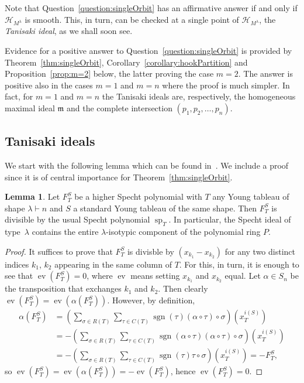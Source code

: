 \documentclass[11pt]{amsart}
\theoremstyle{definition}
\newtheorem{lemma}[theorem]{Lemma}
\newcommand{\mm}{\mathfrak{m}}
\newcommand{\HH}{\mathcal{H}}
\DeclareMathOperator{\spe}{sp}
\DeclareMathOperator{\ev}{ev}
\DeclareMathOperator{\sgn}{sgn}
\begin{document}
Note that Question~\ref{question:singleOrbit} has an affirmative answer if and only if $\HH_{M^\lambda}$ is smooth. This, in turn, can be checked at a single point of $\HH_{M^\lambda}$, the \emph{Tanisaki ideal}, as we shall soon see.

Evidence for a positive answer to Question~\ref{question:singleOrbit} is provided by Theorem~\ref{thm:singleOrbit}, Corollary~\ref{corollary:hookPartition} and Proposition~\ref{prop:m=2} below, the latter proving the case $m=2$. The answer is positive also in the cases $m=1$ and $m=n$ where the proof is much simpler. In fact, for $m=1$ and $m=n$ the Tanisaki ideals are, respectively, the homogeneous maximal ideal $\mm$ and the complete intersection $(p_1,p_2,\ldots,p_n)$.

\subsection{Tanisaki ideals} We start with the following lemma which can be found in~\cite[Theorem~10.2]{nino2019algorithmic}. We include a proof since it is of central importance for Theorem~\ref{thm:singleOrbit}. 

\begin{lemma}\label{lem:higherSpecht}
    Let $F_T^S$ be a higher Specht polynomial with $T$ any Young tableau of shape $\lambda \vdash n$ and $S$ a standard Young tableau of the same shape. Then $F_T^S$ is divisible by the usual Specht polynomial $\spe_T$. In particular, the Specht ideal of type~$\lambda$ contains the entire $\lambda$-isotypic component of the polynomial ring $P$.
\end{lemma}

\begin{proof}
    It suffices to prove that $F_T^S$ is divisble by $(x_{k_1} - x_{k_2})$ for any two distinct indices $k_1$, $k_2$ appearing in the same column of $T$. For this, in turn, it is enough to see that $\ev(F_T^S) = 0$, where $\ev$ means setting $x_{k_1}$ and $x_{k_2}$ equal. Let $\alpha \in S_n$ be the transposition that exchanges $k_1$ and $k_2$. Then clearly $\ev(F_T^S) = \ev(\alpha(F_T^S))$. However, by definition,
    \begin{align*}
        \alpha(F_T^S) &= \left( \sum_{\sigma \in R(T)} \sum_{\tau \in C(T)} \sgn(\tau) (\alpha \circ \tau) \circ \sigma \right) (x_T^{i(S)}) \\ &= - \left( \sum_{\sigma \in R(T)} \sum_{\tau \in C(T)} \sgn(\alpha \circ \tau) (\alpha \circ \tau) \circ \sigma \right) (x_T^{i(S)}) \\ &= - \left( \sum_{\sigma \in R(T)} \sum_{\tau \in C(T)} \sgn(\tau) \tau \circ \sigma \right) (x_T^{i(S)}) = - F_T^S,
    \end{align*}
    so $\ev(F_T^S) = \ev(\alpha(F_T^S)) = - \ev(F_T^S)$, hence $\ev(F_T^S) = 0$.
\end{proof}
\end{document}
